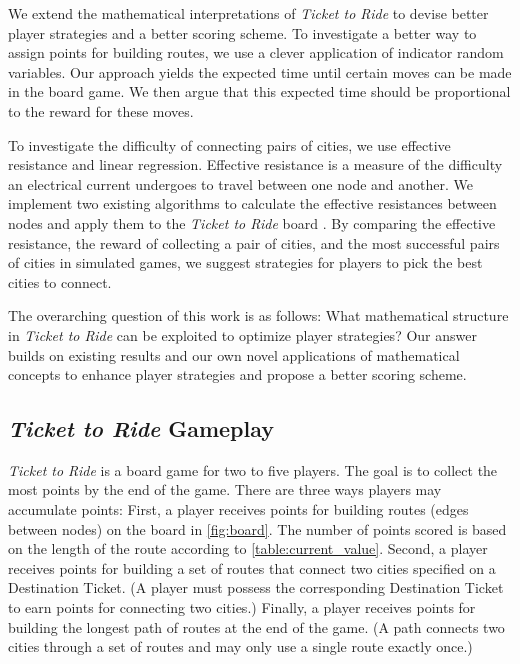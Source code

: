 We extend the mathematical interpretations of
\textit{Ticket to Ride} to devise better player strategies
and a better scoring scheme.
To investigate a better way to assign points for building routes,
we use a clever application of indicator random variables.
Our approach yields the expected time until certain moves
can be made in the board game.
We then argue that this expected time should be proportional
to the reward for these moves.

To investigate the difficulty of connecting pairs of cities,
we use effective resistance and linear regression.
Effective resistance is a measure of the 
difficulty an electrical current
undergoes to travel
between one node and another.
We implement two existing algorithms to calculate
the effective resistances between nodes
and apply them to the \textit{Ticket to Ride}
board \cite{ellens2011effective, wu2004theory}.
By comparing the effective resistance, the reward
of collecting a pair of cities, and the most successful
pairs of cities in simulated games, we suggest
strategies for players to pick the best cities
to connect.

The overarching question of this work is as follows:
What mathematical structure in \textit{Ticket to Ride}
can be exploited to optimize player strategies?
Our answer builds on existing results and
our own novel applications of mathematical concepts to enhance
player strategies and propose a better scoring scheme.

\subsection{\textit{Ticket to Ride} Gameplay}

\textit{Ticket to Ride} is a board game 
for two to five players.
The goal is to collect
the most points by the end of the game.
There are three ways players may accumulate points:
First, a player receives points for building routes
(edges between nodes)
on the board in \cref{fig:board}.
The number of points scored is based on the length of the route
according to \cref{table:current_value}.
Second, a player receives points for building
a set of routes that connect two cities specified
on a Destination Ticket.
(A player must possess the 
corresponding Destination Ticket to earn
points for connecting two cities.)
Finally, a player receives points for building
the longest path of routes at the end of the game.
(A path connects two cities through a set
of routes and may only use a single route exactly once.)

